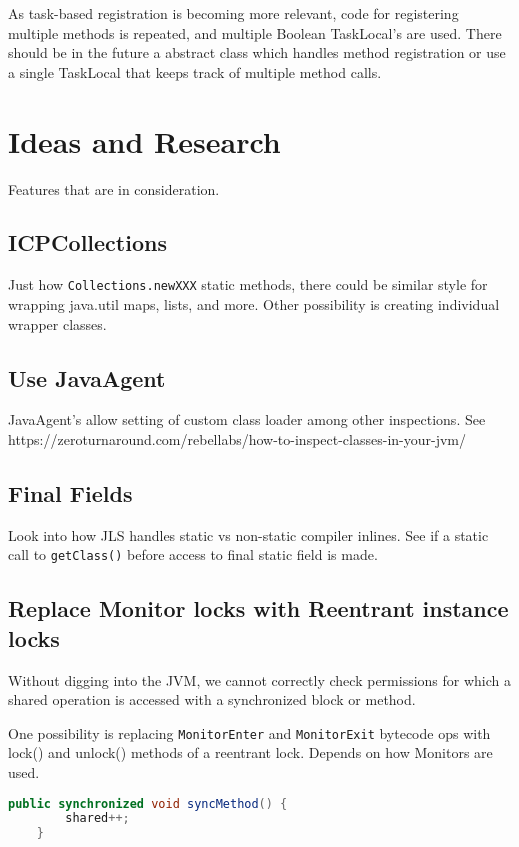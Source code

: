 \documentclass[11pt]{article}
\begin{document}
    As task-based registration is becoming more relevant, code for registering multiple methods is
    repeated, and multiple Boolean TaskLocal's are used. There should be in the future a abstract
    class which handles method registration or use a single TaskLocal that keeps track of multiple
    method calls.

    \section{Ideas and Research}
    Features that are in consideration.

    \subsection{ICPCollections}
    Just how \verb|Collections.newXXX| static methods, there could be similar style for wrapping java.util
    maps, lists, and more. Other possibility is creating individual wrapper classes.

    \subsection{Use JavaAgent}
    JavaAgent's allow setting of custom class loader among other inspections. See
    https://zeroturnaround.com/rebellabs/how-to-inspect-classes-in-your-jvm/

    \subsection{Final Fields}
    Look into how JLS handles static vs non-static compiler inlines.
    See if a static call to \verb|getClass()| before
    access to final static field is made.

    \subsection{Replace Monitor locks with Reentrant instance locks}
    Without digging into the JVM, we cannot correctly check permissions for which a shared operation is accessed
    with a synchronized block or method.

    One possibility is replacing \verb|MonitorEnter| and \verb|MonitorExit| bytecode ops with lock() and unlock() methods
    of a reentrant lock. Depends on how Monitors are used.

    \begin{lstlisting}[language=java, caption=Synchornized Method]
    public synchronized void syncMethod() {
        shared++;
    }
    \end{lstlisting}
\end{document}
